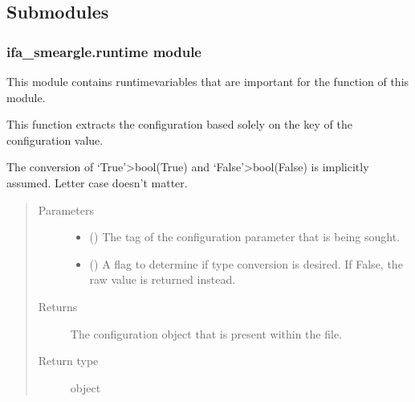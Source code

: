 \documentclass[letterpaper,10pt,english]{sphinxmanual}
\begin{document}
\subsection{Submodules}
\label{\detokenize{docstrings/ifa_smeargle:submodules}}

\subsubsection{ifa\_smeargle.runtime module}
\label{\detokenize{docstrings/ifa_smeargle.runtime:module-ifa_smeargle.runtime}}\label{\detokenize{docstrings/ifa_smeargle.runtime:ifa-smeargle-runtime-module}}\label{\detokenize{docstrings/ifa_smeargle.runtime::doc}}
This module contains runtime\sphinxhyphen{}variables that are important for the
function of this module.

\begin{fulllineitems}
\label{\detokenize{docstrings/ifa_smeargle.runtime:ifa_smeargle.runtime.extract_runtime_configuration}}
This function extracts the configuration based solely on the
key of the configuration value.

The conversion of ‘True’\sphinxhyphen{}\textgreater{}bool(True) and ‘False’\sphinxhyphen{}\textgreater{}bool(False) is
implicitly assumed. Letter case doesn’t matter.
\begin{quote}\begin{description}
\item[{Parameters}] \leavevmode\begin{itemize}
\item {} 
 () \textendash{} The tag of the configuration parameter that is being sought.

\item {} 
 () \textendash{} A flag to determine if type conversion is desired. If False,
the raw value is returned instead.

\end{itemize}

\item[{Returns}] \leavevmode
{} \textendash{} The configuration object that is present within the file.

\item[{Return type}] \leavevmode
object

\end{description}\end{quote}

\end{fulllineitems}
\end{document}
